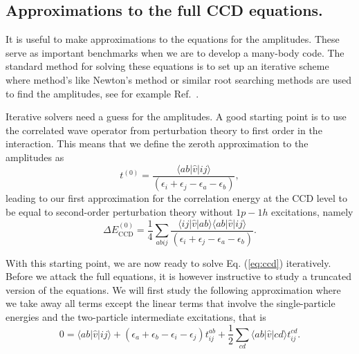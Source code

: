   \subsection{Approximations to the full CCD equations.}
  It is useful to make approximations to the equations for the
  amplitudes. These serve as important benchmarks when we are to develop a many-body code.
The standard method for solving these equations is to
  set up an iterative scheme where method's like Newton's method or
  similar root searching methods are used to find the amplitudes, see for example Ref.~\cite{baran2008}.

  Iterative solvers need a guess for the amplitudes. A good starting
  point is to use the correlated wave operator from perturbation
  theory to first order in the interaction.  This means that we define
  the zeroth approximation to the amplitudes as
  \[
  t^{(0)}=\frac{\langle ab \vert \hat{v} \vert ij
    \rangle}{\left(\epsilon_i+\epsilon_j-\epsilon_a-\epsilon_b\right)},
  \]
  leading to our first approximation for the correlation energy at the
  CCD level to be equal to second-order perturbation theory without
  $1p-1h$ excitations, namely
  \[
  \Delta E_{\mathrm{CCD}}^{(0)}=\frac{1}{4}\sum_{abij} \frac{\langle
    ij \vert \hat{v} \vert ab \rangle \langle ab \vert \hat{v} \vert
    ij
    \rangle}{\left(\epsilon_i+\epsilon_j-\epsilon_a-\epsilon_b\right)}.
  \]

  With this starting point, we are now ready to solve
  Eq. (\ref{eq:ccd}) iteratively. Before we attack the full equations,
  it is however instructive to study a truncated version of the
  equations. We will first study the following approximation where we
  take away all terms except the linear terms that involve the
  single-particle energies and the two-particle intermediate
  excitations, that is
  \begin{equation}
  0 = \langle ab \vert \hat{v} \vert ij \rangle +
  \left(\epsilon_a+\epsilon_b-\epsilon_i-\epsilon_j\right)t_{ij}^{ab}+\frac{1}{2}\sum_{cd}
  \langle ab \vert \hat{v} \vert cd \rangle t_{ij}^{cd}.
  \label{eq:ccd1}
  \end{equation}

